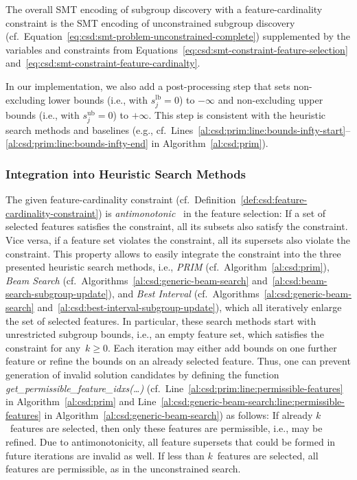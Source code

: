 \documentclass{article}
\theoremstyle{definition}
\begin{document}
The overall SMT encoding of subgroup discovery with a feature-cardinality constraint is the SMT encoding of unconstrained subgroup discovery (cf.~Equation~\ref{eq:csd:smt-problem-unconstrained-complete}) supplemented by the variables and constraints from Equations~\ref{eq:csd:smt-constraint-feature-selection} and~\ref{eq:csd:smt-constraint-feature-cardinalty}.

In our implementation, we also add a post-processing step that sets non-excluding lower bounds (i.e., with $s^{\text{lb}}_j = 0$) to $-\infty$ and non-excluding upper bounds (i.e., with $s^{\text{ub}}_j = 0$) to $+\infty$.
This step is consistent with the heuristic search methods and baselines (e.g., cf.~Lines~\ref{al:csd:prim:line:bounds-infty-start}--\ref{al:csd:prim:line:bounds-infty-end} in Algorithm~\ref{al:csd:prim}).

\subsubsection{Integration into Heuristic Search Methods}
\label{sec:csd:approach:cardinality:heuristics}

The given feature-cardinality constraint (cf.~Definition~\ref{def:csd:feature-cardinality-constraint}) is \emph{antimonotonic}~\cite{ng1998exploratory} in the feature selection:
If a set of selected features satisfies the constraint, all its subsets also satisfy the constraint.
Vice versa, if a feature set violates the constraint, all its supersets also violate the constraint.
This property allows to easily integrate the constraint into the three presented heuristic search methods, i.e., \emph{PRIM} (cf.~Algorithm~\ref{al:csd:prim}), \emph{Beam Search} (cf.~Algorithms~\ref{al:csd:generic-beam-search} and~\ref{al:csd:beam-search-subgroup-update}), and \emph{Best Interval} (cf.~Algorithms~\ref{al:csd:generic-beam-search} and~\ref{al:csd:best-interval-subgroup-update}), which all iteratively enlarge the set of selected features.
In particular, these search methods start with unrestricted subgroup bounds, i.e., an empty feature set, which satisfies the constraint for any~$k \geq 0$.
Each iteration may either add bounds on one further feature or refine the bounds on an already selected feature.
Thus, one can prevent generation of invalid solution candidates by defining the function \emph{get\_permissible\_feature\_idxs(\dots)} (cf.~Line~\ref{al:csd:prim:line:permissible-features} in Algorithm~\ref{al:csd:prim} and Line~\ref{al:csd:generic-beam-search:line:permissible-features} in Algorithm~\ref{al:csd:generic-beam-search}) as follows:
If already $k$~features are selected, then only these features are permissible, i.e., may be refined.
Due to antimonotonicity, all feature supersets that could be formed in future iterations are invalid as well.
If less than $k$~features are selected, all features are permissible, as in the unconstrained search.
\end{document}
